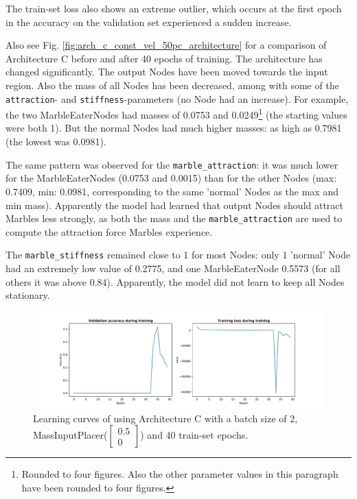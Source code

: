 The train-set loss also shows an extreme outlier, which occurs at the first epoch in the accuracy on the validation set experienced a sudden increase. 

Also see Fig. \ref{fig:arch_c_const_vel_50pc_architecture} for a comparison of Architecture C before and after 40 epochs of training. The architecture has changed significantly. The output Nodes have been moved towards the input region. Also the mass of all Nodes has been decreased, among with some of the \texttt{attraction}- and \texttt{stiffness}-parameters (no Node had an increase). For example, the two MarbleEaterNodes had masses of 0.0753 and 0.0249\footnote{Rounded to four figures. Also the other parameter values in this paragraph have been rounded to four figures.} (the starting values were both 1). But the normal Nodes had much higher masses: as high as 0.7981 (the lowest was 0.0981).

The same pattern was observed for the \texttt{marble\_attraction}: 
it was much lower for the MarbleEaterNodes (0.0753 and 0.0015) 
than for the other Nodes 
(max: 0.7409, min: 0.0981, corresponding to the same 'normal' Nodes as the max and min mass).
Apparently the model had learned that output Nodes should attract Marbles less strongly, 
as both the mass and the \texttt{marble\_attraction} are used to compute the attraction force Marbles experience.

The \texttt{marble\_stiffness} remained close to 1 for most Nodes: only 1 'normal' Node had an extremely low value of 0.2775, and one MarbleEaterNode 0.5573 (for all others it was above 0.84). Apparently, the model did not learn to keep all Nodes stationary. 

\begin{figure}[hb]
	\centering
	\includegraphics[scale=0.4]{figures/C_batch1_ConstVelInputPlacer([0.5, 0]])_epoch40_stats.pdf}
	\caption{Learning curves of using Architecture C with 
		a batch size of 2, MassInputPlacer($\begin{bmatrix} 0.5\\0\end{bmatrix}$) and 40 train-set epochs.}
	\label{fig:arch_c_const_vel_50pc_learning_curve}
\end{figure}


